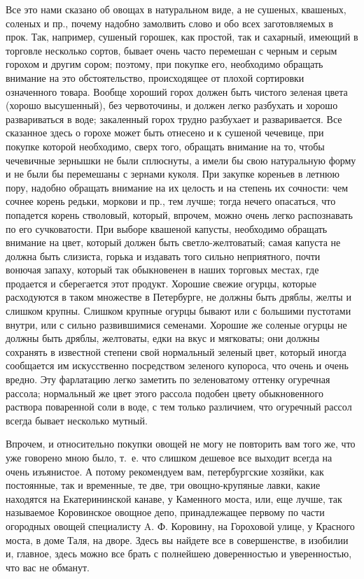 Все это нами сказано об овощах в натуральном виде, а не сушеных, квашеных, соленых и пр., почему надобно замолвить слово и обо всех заготовляемых в прок. Так, например, сушеный горошек, как простой, так и сахарный, имеющий в торговле несколько сортов, бывает очень часто перемешан с черным и серым горохом и другим сором; поэтому, при покупке его, необходимо обращать внимание на это обстоятельство, происходящее от плохой сортировки означенного товара. Вообще хороший горох должен быть чистого зеленая цвета (хорошо высушенный), без червоточины, и должен легко разбухать и хорошо развариваться в воде; закаленный горох трудно разбухает и разваривается. Все сказанное здесь о горохе может быть отнесено и к сушеной чечевице, при покупке которой необходимо, сверх того, обращать внимание на то, чтобы чечевичные зернышки не были сплюснуты, а имели бы свою натуральную форму и не были бы перемешаны с зернами куколя. При закупке кореньев в летнюю пору, надобно обращать внимание на их целость и на степень их сочности: чем сочнее корень редьки, моркови и пр., тем лучше; тогда нечего опасаться, что попадется корень стволовый, который, впрочем, можно очень легко распознавать по его сучковатости. При выборе квашеной капусты, необходимо обращать внимание на цвет, который должен быть светло-желтоватый; самая капуста не должна быть слизиста, горька и издавать того сильно неприятного, почти вонючая запаху, который так обыкновенен в наших торговых местах, где продается и сберегается этот продукт. Хорошие свежие огурцы, которые расходуются в таком множестве в Петербурге, не должны быть дряблы, желты и слишком крупны. Слишком крупные огурцы бывают или с большими пустотами внутри, или с сильно развившимися семенами. Хорошие же соленые огурцы не должны быть дряблы, желтоваты, едки на вкус и мягковаты; они должны сохранять в известной степени свой нормальный зеленый цвет, который иногда сообщается им искусственно посредством зеленого купороса, что очень и очень вредно. Эту фарлатацию легко заметить по зеленоватому оттенку огуречная рассола; нормальный же цвет этого рассола подобен цвету обыкновенного раствора поваренной соли в воде, с тем только различием, что огуречный рассол всегда бывает несколько мутный.

Впрочем, и относительно покупки овощей не могу не повторить вам того же, что уже говорено мною было, т.~е. что слишком дешевое все выходит всегда на очень изъянистое. А потому рекомендуем вам, петербургские хозяйки, как постоянные, так и временные, те две, три овощно-крупяные лавки, какие находятся на Екатерининской канаве, у Каменного моста, или, еще лучше, так называемое Коровинское овощное депо, принадлежащее первому по части огородных овощей специалисту A. Ф. Коровину, на Гороховой улице, у Красного моста, в доме Таля, на дворе. Здесь вы найдете все в совершенстве, в изобилии и, главное, здесь можно все брать с полнейшею доверенностью и уверенностью, что вас не обманут.

